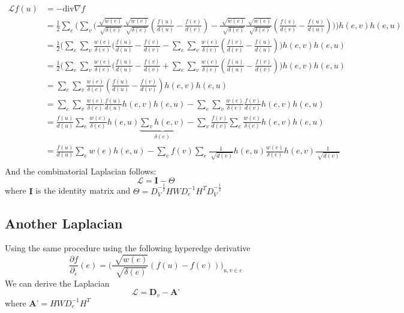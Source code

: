 \documentclass[12pt]{article}\pagestyle{myheadings}
\theoremstyle{plain}
\newcommand{\lapl}{\mathcal{L}}
\newcommand{\Div}{\text{div}}
\begin{document}
\begin{equation*}
\begin{split}
\lapl f(u) &= -\Div \nabla f \\
 & = \frac{1}{2} \sum_e  \big(  \sum_{v } \big( \frac{\sqrt[]{w(e)}}{\sqrt[]{\delta(e)}}\frac{\sqrt[]{w(e)}}{\sqrt[]{\delta(e)}}(\frac{f(u)}{d(u)}-\frac{f(v)}{d(v)} )-  \frac{\sqrt[]{w(e)}}{\sqrt[]{\delta(e)}}\frac{\sqrt[]{w(e)}}{\sqrt[]{\delta(e)}}(\frac{f(v)}{d(v)}-\frac{f(u)}{d(u)} ) \big)\big)h(e,v) h(e,u)\\
 & = \frac{1}{2} \big( \sum_e    \sum_{v }\frac{w(e)}{\delta(e)}(\frac{f(u)}{d(u)}-\frac{f(v)}{d(v)} - \sum_e    \sum_{v }  \frac{w(e)}{\delta(e)}(\frac{f(v)}{d(v)}-\frac{f(u)}{d(u)}) \big)h(e,v) h(e,u)\\
 & =  \frac{1}{2} \big( \sum_e    \sum_{v }\frac{w(e)}{\delta(e)}(\frac{f(u)}{d(u)}-\frac{f(v)}{d(v)} + \sum_e    \sum_{v }  \frac{w(e)}{\delta(e)}(\frac{f(u)}{d(u)}-\frac{f(v)}{d(v)} ) \big)h(e,v) h(e,u)\\
 & =  \sum_e    \sum_{v }\frac{w(e)}{\delta(e)}(\frac{f(u)}{d(u)}-\frac{f(v)}{d(v)} )h(e,v) h(e,u)\\
 & =  \sum_e \sum_{v }\frac{w(e)}{\delta(e)}\frac{f(u)}{d(u)}h(e,v) h(e,u)- \sum_e \sum_{v }\frac{w(e)}{\delta(e)}\frac{f(v)}{d(v)}h(e,v) h(e,u)\\
 & = \frac{f(u)}{d(u)}\sum_e \frac{w(e)}{\delta(e)} h(e,u)\underbrace{\sum_{v }h(e,v)}_{\delta(e)}- \sum_{v }\frac{f(v)}{d(v)}\sum_e \frac{w(e)}{\delta(e)}h(e,v) h(e,u)\\
  & = \frac{f(u)}{d(u)}\sum_e w(e) h(e,u)- \sum_{v }f(v)\sum_e \frac{1}{\sqrt[]{d(v)}}h(e,u)  \frac{w(e)}{\delta(e)} h(e,v) \frac{1}{\sqrt[]{d(v)}}\\
\end{split}
\end{equation*}
And the combinatorial Laplacian follows:
$$ \lapl = \textbf{I} - \textbf{$\Theta$}$$
where $\textbf{I}$ is the identity matrix and $\textbf{$\Theta$} = \textbf{$D_V^{-\frac{1}{2}}HWD_e^{-1}H^TD_V^{-\frac{1}{2}}$}$

\subsection{Another Laplacian}

Using the same procedure using the following hyperedge derivative
$$\frac{\partial f}{\partial_e} (e) =  \Bigg(\frac{\sqrt[]{w(e)}}{\sqrt[]{\delta(e)}}(f(u)-f(v) ) \Bigg)_{u,v \in e} $$
We can derive the Laplacian $$ \lapl = \textbf{D}_v - \textbf{A'}$$
where  $\textbf{A'} = \textbf{$HWD_e^{-1}H^T$}$
\end{document}
